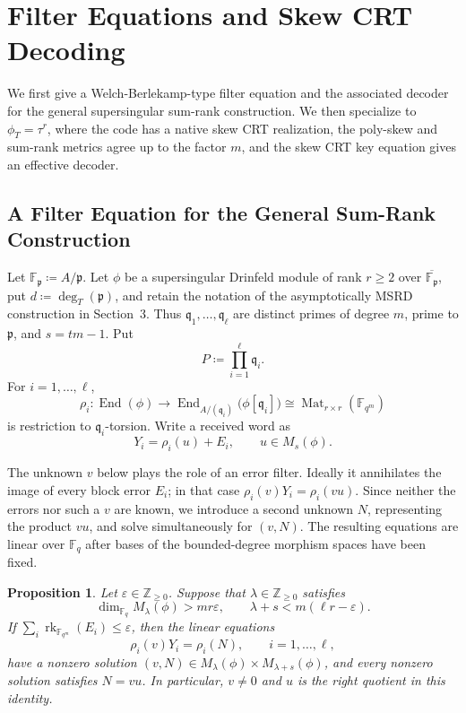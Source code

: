 \documentclass[10pt,a4paper]{amsart}
\DeclareMathOperator{\End}{End}
\DeclareMathOperator{\Mat}{Mat}
\DeclareMathOperator{\rk}{rk}
\theoremstyle{definition}
\theoremstyle{plain}
\newtheorem{proposition}[definition]{Proposition}
\theoremstyle{remark}
\newcommand{\vF}{\mathbb F}
\renewcommand{\epsilon}{\varepsilon}
\begin{document}
\section{Filter Equations and Skew CRT Decoding}

We first give a Welch-Berlekamp-type filter equation and the associated
decoder for the general supersingular sum-rank construction. We then specialize to
$\phi_T=\tau^r$, where the code has a native skew CRT realization, the
poly-skew and sum-rank metrics agree up to the factor $m$, and the skew CRT
key equation gives an effective decoder.

\subsection{A Filter Equation for the General Sum-Rank Construction}

Let $\vF_{\mathfrak p}\coloneqq A/\mathfrak p$. Let $\phi$ be a
supersingular Drinfeld module of rank $r\geq 2$ over
$\overline{\vF_{\mathfrak p}}$, put
$d\coloneqq\deg_T(\mathfrak p)$, and retain the notation of the asymptotically
MSRD construction in Section~3. Thus
$\mathfrak q_1,\ldots,\mathfrak q_\ell$ are distinct primes of degree $m$,
prime to $\mathfrak p$, and $s=tm-1$. Put
$$
P\coloneqq\prod_{i=1}^{\ell}\mathfrak q_i.
$$
For $i=1,\ldots,\ell$,
$$
\rho_i:\End(\phi)
\longrightarrow
\End_{A/(\mathfrak q_i)}\bigl(\phi[\mathfrak q_i]\bigr)
\cong
\Mat_{r\times r}(\vF_{q^m})
$$
is restriction to $\mathfrak q_i$-torsion. Write a received word as
$$
Y_i=\rho_i(u)+E_i,
\qquad
u\in M_s(\phi).
$$

The unknown $v$ below plays the role of an error filter. Ideally it
annihilates the image of every block error $E_i$; in that case
$\rho_i(v)Y_i=\rho_i(vu)$. Since neither the errors nor such a $v$ are
known, we introduce a second unknown $N$, representing the product $vu$, and
solve simultaneously for $(v,N)$. The resulting equations are linear over
$\vF_q$ after bases of the bounded-degree morphism spaces have been fixed.

\begin{proposition}
\label{prop:general-filter-equation}
Let $\epsilon\in\mathbb Z_{\geq 0}$. Suppose that
$\lambda\in\mathbb Z_{\geq 0}$ satisfies
$$
\dim_{\vF_q}M_\lambda(\phi)>mr\epsilon,
\qquad
\lambda+s<m(\ell r-\epsilon).
$$
If $\sum_i\rk_{\vF_{q^m}}(E_i)\leq\epsilon$, then the linear equations
$$
\rho_i(v)Y_i=\rho_i(N),
\qquad i=1,\ldots,\ell,
$$
have a nonzero solution
$(v,N)\in M_\lambda(\phi)\times M_{\lambda+s}(\phi)$, and every nonzero
solution satisfies $N=vu$. In particular, $v\neq0$ and $u$ is the right
quotient in this identity.
\end{proposition}
\end{document}
